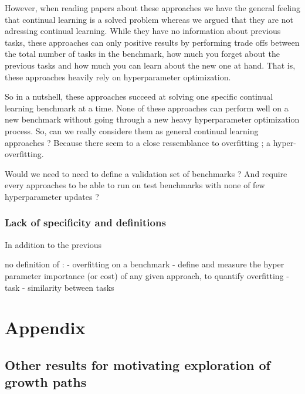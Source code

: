 \documentclass{article}
\begin{document}
However, when reading papers about these approaches we have the general feeling that continual learning is a solved problem whereas we argued that they are not adressing continual learning. While they have no information about previous tasks, these approaches can only positive results by performing trade offs between the total number of tasks in the benchmark, how much you forget about the previous tasks and how much you can learn about the new one at hand. That is, these approaches heavily rely on hyperparameter optimization.


So in a nutshell, these approaches succeed at solving one specific continual learning benchmark at a time. None of these approaches can perform well on a new benchmark without going through a new heavy hyperparameter optimization process. So, can we really considere them as general continual learning approaches ? Because there seem to a close ressemblance to overfitting ; a hyper-overfitting.

Would we need to need to define a validation set of benchmarks ? And require every approaches to be able to run on test benchmarks with none of few hyperparameter updates ?


\subsubsection{Lack of specificity and definitions}

In addition to the previous

no definition of :
- overfitting on a benchmark
    - define and measure the hyper parameter importance (or cost) of any given approach, to quantify overfitting
- task
- similarity between tasks

\nocite{*}
\printbibliography


\section*{Appendix}
\subsection{Other results for motivating exploration of growth paths}
\end{document}
